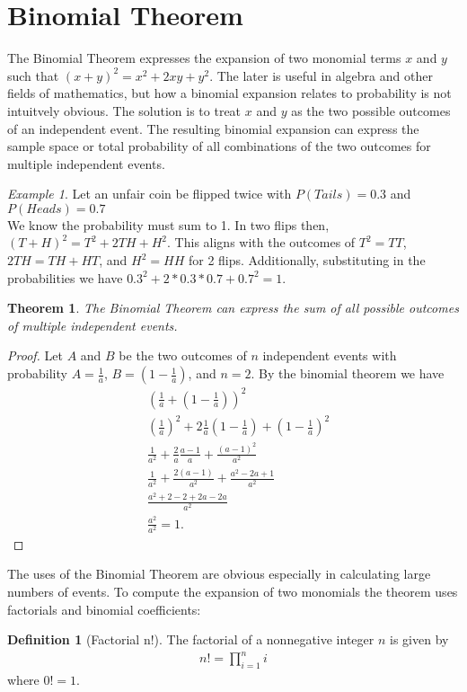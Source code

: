 \documentclass{article}
\theoremstyle{plain}
\newtheorem{theorem}{Theorem}
\theoremstyle{definition}
\newtheorem{definition}{Definition}
\theoremstyle{remark}
\newtheorem{example}{Example}
\begin{document}
\section{Binomial Theorem}
The Binomial Theorem expresses the expansion of two monomial terms $x$ and $y$ such that $(x + y)^2 = x^2 + 2xy + y^2$. The later is useful in algebra and other fields of mathematics, but how a binomial expansion relates to probability is not intuitvely obvious. The solution is to treat $x$ and $y$ as the two possible outcomes of an independent event. The resulting binomial expansion can express the sample space or total probability of all combinations of the two outcomes for multiple independent events.
\begin{example}
  Let an unfair coin be flipped twice with $P(Tails) = 0.3$ and $P(Heads) = 0.7$ \\
  We know the probability must sum to 1. In two flips then, $(T + H)^2 = T^2 + 2TH + H^2$. This aligns with the outcomes of $T^2 = TT$, $2TH = TH + HT$, and $H^2 = HH$ for 2 flips. Additionally, substituting in the probabilities we have $0.3^2 + 2*0.3*0.7 + 0.7^2 = 1$.
\end{example}
\begin{theorem}
  The Binomial Theorem can express the sum of all possible outcomes of multiple independent events.
\end{theorem}
\begin{proof}
  Let $A$ and $B$ be the two outcomes of $n$ independent events with probability $A = \frac{1}{a}$, $B = (1 - \frac{1}{a})$, and $n = 2$. By the binomial theorem we have
  \begin{align*}
    &(\frac{1}{a} + (1-\frac{1}{a}))^2 \\
    &(\frac{1}{a})^2 + 2\frac{1}{a}(1-\frac{1}{a}) + (1-\frac{1}{a})^2 \\
    &\frac{1}{a^2} + \frac{2}{a}\frac{a-1}{a} + \frac{(a-1)^2}{a^2} \\
    &\frac{1}{a^2} + \frac{2(a-1)}{a^2} + \frac{a^2-2a+1}{a^2} \\
    &\frac{a^2+2-2+2a-2a}{a^2} \\
    &\frac{a^2}{a^2} = 1.
  \end{align*}
\end{proof}
The uses of the Binomial Theorem are obvious especially in calculating large numbers of events. To compute the expansion of two monomials the theorem uses factorials and binomial coefficients:
\begin{definition}[Factorial n!]
  The factorial of a nonnegative integer $n$ is given by
  \begin{align*}
    n! = {\displaystyle\prod_{i=1}^{n}i}
  \end{align*}
  where $0! = 1$.
\end{definition}
\end{document}
